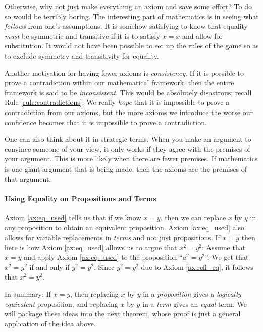 \documentclass[12pt]{article}
\newcounter{rule}
\newcounter{theorem}
\begin{document}
Otherwise, why not just make everything an axiom and save some effort?
To do so would be terribly boring.
The interesting part of mathematics is in seeing what \emph{follows} from one's assumptions.
It is somehow satisfying to know that equality \emph{must} be symmetric and transitive
if it is to satisfy $x=x$ and allow for substitution.
It would not have been possible to set up the rules of the game so as to exclude symmetry and transitivity for equality.

Another motivation for having fewer axioms is \emph{consistency}.
If it is possible to prove a contradiction within our mathematical framework, then
the entire framework is said to be \emph{inconsistent}.
This would be absolutely disastrous; recall Rule \ref{rule:contradictions}.
We really \emph{hope} that it is impossible to prove a contradiction from our axioms,
but the more axioms we introduce the worse our confidence becomes that it is impossible to prove a contradiction.

One can also think about it in strategic terms.
When you make an argument to convince someone of your view,
it only works if they agree
with the premises of your argument.
This is more likely when there are fewer premises.
If mathematics is one giant argument that is being made,
then the axioms are the premises of that argument.

\paragraph{Using Equality on Propositions and Terms}
Axiom \ref{ax:eq_used} tells us that if we know $x=y$, then we can replace $x$ by $y$ in any proposition to obtain an
equivalent proposition.
Axiom \ref{ax:eq_used} also allows for variable replacements in \emph{terms} and not just propositions.
If $x=y$ then here is how Axiom \ref{ax:eq_used} allows us to argue that $x^2=y^2$:
Assume that $x=y$ and apply Axiom \ref{ax:eq_used} to the proposition ``$a^2=y^2$''.
We get that $x^2=y^2$ if and only if $y^2=y^2$. Since $y^2=y^2$ due to Axiom \ref{ax:refl_eq},
it follows that $x^2=y^2$.

In summary:
If $x=y$, then replacing $x$ by $y$ in a \emph{proposition} gives a \emph{logically equivalent} proposition,
and replacing $x$ by $y$ in a \emph{term} gives an \emph{equal} term. We will package these ideas into the next theorem,
whose proof is just a general application of the idea above.

\def\tA{\smiley{}}
\end{document}
